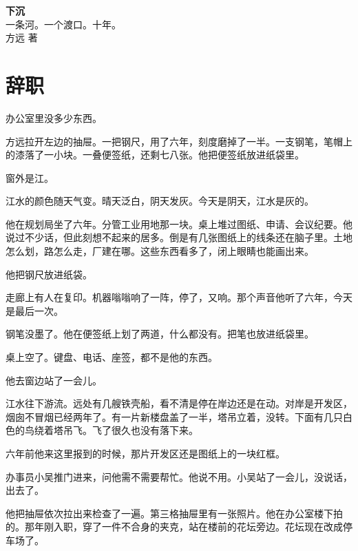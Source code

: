 \documentclass[UTF8,a5paper,11pt,openany]{ctexbook}
\begin{document}
\begin{titlepage}
\vspace*{4cm}
\begin{center}
    {\fontsize{36}{44}\bfseries\heiti 下\quad 沉\\[0.5cm]}
    \vspace{2cm}
    {\Large\kaishu 一条河。一个渡口。十年。}\\[1cm]
    \vspace{3cm}
    {\normalsize\kaishu 方远 著}\\[0.3cm]
\end{center}
\end{titlepage}

\tableofcontents

\chapter{辞职}
\indent
办公室里没多少东西。

方远拉开左边的抽屉。一把钢尺，用了六年，刻度磨掉了一半。一支钢笔，笔帽上的漆落了一小块。一叠便签纸，还剩七八张。他把便签纸放进纸袋里。

窗外是江。

江水的颜色随天气变。晴天泛白，阴天发灰。今天是阴天，江水是灰的。

他在规划局坐了六年。分管工业用地那一块。桌上堆过图纸、申请、会议纪要。他说过不少话，但此刻想不起来的居多。倒是有几张图纸上的线条还在脑子里。土地怎么划，路怎么走，厂建在哪。这些东西看多了，闭上眼睛也能画出来。

他把钢尺放进纸袋。

走廊上有人在复印。机器嗡嗡响了一阵，停了，又响。那个声音他听了六年，今天是最后一次。

钢笔没墨了。他在便签纸上划了两道，什么都没有。把笔也放进纸袋里。

桌上空了。键盘、电话、座签，都不是他的东西。

他去窗边站了一会儿。

江水往下游流。远处有几艘铁壳船，看不清是停在岸边还是在动。对岸是开发区，烟囱不冒烟已经两年了。有一片新楼盘盖了一半，塔吊立着，没转。下面有几只白色的鸟绕着塔吊飞。飞了很久也没有落下来。

六年前他来这里报到的时候，那片开发区还是图纸上的一块红框。

办事员小吴推门进来，问他需不需要帮忙。他说不用。小吴站了一会儿，没说话，出去了。

他把抽屉依次拉出来检查了一遍。第三格抽屉里有一张照片。他在办公室楼下拍的。那年刚入职，穿了一件不合身的夹克，站在楼前的花坛旁边。花坛现在改成停车场了。
\end{document}
